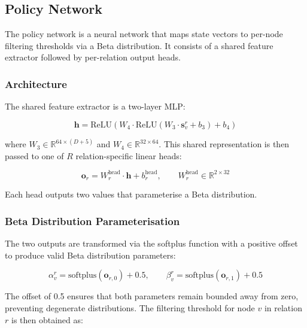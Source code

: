 \subsection{Policy Network}
\label{sec:policy-network}

The policy network is a neural network that maps state vectors to per-node filtering thresholds via a Beta distribution. It consists of a shared feature extractor followed by per-relation output heads.

\subsubsection{Architecture}

The shared feature extractor is a two-layer MLP:

\begin{equation}
\mathbf{h} = \text{ReLU}\left( W_4 \cdot \text{ReLU}\left( W_3 \cdot \mathbf{s}_v^r + b_3 \right) + b_4 \right)
\end{equation}

\noindent
where \( W_3 \in \mathbb{R}^{64 \times (D+5)} \) and \( W_4 \in \mathbb{R}^{32 \times 64} \). This shared representation is then passed to one of \( R \) relation-specific linear heads:

\begin{equation}
\mathbf{o}_r = W_r^{\text{head}} \cdot \mathbf{h} + b_r^{\text{head}}, \qquad W_r^{\text{head}} \in \mathbb{R}^{2 \times 32}
\end{equation}

\noindent
Each head outputs two values that parameterise a Beta distribution.

\subsubsection{Beta Distribution Parameterisation}

The two outputs are transformed via the softplus function with a positive offset to produce valid Beta distribution parameters:

\begin{equation}
\alpha_v^r = \text{softplus}(\mathbf{o}_{r,0}) + 0.5, \qquad \beta_v^r = \text{softplus}(\mathbf{o}_{r,1}) + 0.5
\end{equation}

\noindent
The offset of 0.5 ensures that both parameters remain bounded away from zero, preventing degenerate distributions. The filtering threshold for node \( v \) in relation \( r \) is then obtained as:

